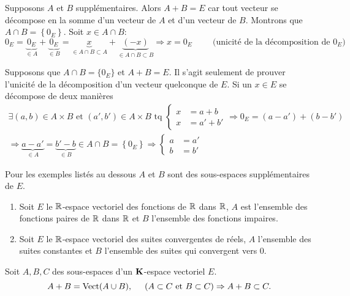 \begin{demo}
Supposons $A$ et $B$ supplémentaires. Alors $A+B=E$ car tout vecteur se décompose en la somme d'un vecteur de $A$ et d'un vecteur de $B$. Montrons que $A\cap B = \left\lbrace 0_E \right\rbrace$.\newline
Soit $x\in A\cap B$:
\begin{displaymath}
  0_E = \underset{\in A}{\underbrace{0_E}} + \underset{\in B}{\underbrace{0_E}} =
  \underset{\in A\cap B \subset A}{\underbrace{x}} + \underset{\in A\cap B \subset B}{\underbrace{(-x)}}
\Rightarrow x = 0_E\hspace{1cm} \text{(unicité de la décomposition de $0_E$)} 
\end{displaymath}

Supposons que $A\cap B=\{0_E\}$ et $A+B=E$. Il s'agit seulement de prouver l'unicité de la décomposition d'un vecteur quelconque de $E$. Si un $x\in E$ se décompose de deux manières
\begin{multline*}
\exists (a,b)\in A\times B \text{ et } (a',b')\in A\times B \text{ tq }
\left\lbrace 
\begin{aligned}
  x &= a+ b \\ x &= a' + b'
\end{aligned}
\right. \Rightarrow 0_E = (a-a') + (b-b') \\
\Rightarrow \underset{\in A}{\underbrace{a-a'}} = \underset{\in B}{\underbrace{b'-b}} \in A\cap B = \left\lbrace 0_E\right\rbrace 
\Rightarrow
\left\lbrace 
\begin{aligned}
  a &=a' \\ b &= b'
\end{aligned}
\right. 
\end{multline*}
\end{demo}
\begin{exples}
Pour les exemples listés au dessous $A$ et $B$ sont des sous-espaces supplémentaires de $E$.
  \begin{enumerate}
    \item Soit $E$ le $\mathbb{R}$-espace vectoriel des fonctions de $\mathbb{R}$ dans $\mathbb{R}$, $A$ est l'ensemble des fonctions paires de $\mathbb{R}$ dans $\mathbb{R}$ et $B$ l'ensemble des fonctions impaires. 
    \item Soit $E$ le $\mathbb{R}$-espace vectoriel des suites convergentes de réels, $A$ l'ensemble des suites constantes et $B$ l'ensemble des suites qui convergent vers $0$.
  \end{enumerate}
\end{exples}
\begin{rems}
  Soit $A, B, C$ des sous-espaces d'un $\mathbf{K}$-espace vectoriel $E$.
\[
  A+B = \mathop{\mathrm{Vect}}(A\cup B), \hspace{0.5cm} \left(A\subset C \text{ et } B \subset C\right) \Rightarrow A+B \subset C.
\]
\end{rems}


